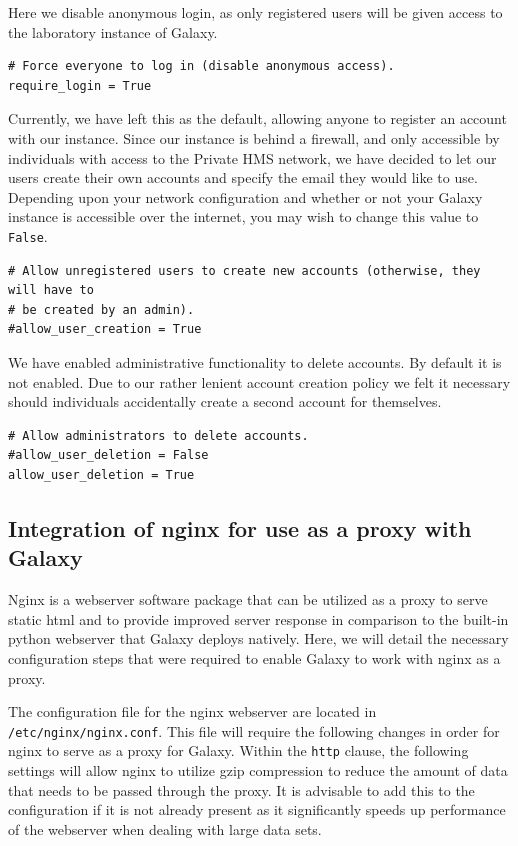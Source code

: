 \documentclass[a4paper,10pt]{article}
\begin{document}
Here we disable anonymous login, as only registered users will be given access to the laboratory instance of Galaxy.
\begin{lstlisting}
# Force everyone to log in (disable anonymous access).
require_login = True
\end{lstlisting}

Currently, we have left this as the default, allowing anyone to register an account with our instance.  Since our instance is behind a firewall, and only accessible by individuals with access to the Private HMS network, we have decided to let our users create their own accounts and specify the email they would like to use.  Depending upon your network configuration and whether or not your Galaxy instance is accessible over the internet, you may wish to change this value to \texttt{False}.
\begin{lstlisting}
# Allow unregistered users to create new accounts (otherwise, they will have to
# be created by an admin).
#allow_user_creation = True
\end{lstlisting}

We have enabled administrative functionality to delete accounts.  By default it is not enabled.  Due to our rather lenient account creation policy we felt it necessary should individuals accidentally create a second account for themselves.
\begin{lstlisting}
# Allow administrators to delete accounts.
#allow_user_deletion = False
allow_user_deletion = True
\end{lstlisting}

\subsection{Integration of nginx for use as a proxy with Galaxy}
Nginx is a webserver software package that can be utilized as a proxy to serve static html and to provide improved server response in comparison to the built-in python webserver that Galaxy deploys natively.  Here, we will detail the necessary configuration steps that were required to enable Galaxy to work with nginx as a proxy.

The configuration file for the nginx webserver are located in \texttt{\footnotesize{/etc/nginx/nginx.conf}}.  This file will require the following changes in order for nginx to serve as a proxy for Galaxy.
Within the \texttt{\footnotesize{http}} clause, the following settings will allow nginx to utilize gzip compression to reduce the amount of data that needs to be passed through the proxy.  It is advisable to add this to the configuration if it is not already present as it significantly speeds up performance of the webserver when dealing with large data sets.
\end{document}

